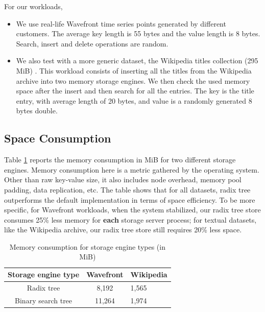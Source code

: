 \documentclass[sigplan,screen,nonacm]{acmart}
\begin{document}
For our workloads, 
\begin{itemize}
    \item We use real-life Wavefront time series points generated by different customers. The average key length is 55 bytes and the value length is 8 bytes. Search, insert and delete operations are random. 
    \item We also test with a more generic dataset, the Wikipedia titles collection (295 MiB) \cite{wikidatasets}. This workload consists of inserting all the titles from the Wikipedia archive into two memory storage engines. We then check the used memory space after the insert and then search for all the entries. The key is the title entry, with average length of 20 bytes, and value is a randomly generated 8 bytes double. 
\end{itemize}

\subsection{Space Consumption}
Table \ref{tab:memory-usage} reports the memory consumption in MiB for two different storage engines. Memory consumption here is a metric gathered by the operating system.  Other than raw key-value size, it also includes node overhead, memory pool padding, data replication, etc. The table shows that for all datasets, radix tree outperforms the default implementation in terms of space efficiency. To be more specific, for Wavefront workloads, when the system stabilized, our radix tree store consumes 25\% less memory for \textbf {each} storage server process; for textual datasets, like the Wikipedia archive, our radix tree store still requires 20\% less space. 
\begin{table}[h]
  \caption{Memory consumption for storage engine types (in MiB)}
  \begin{tabular}{ccl}
    \toprule
    Storage engine type&Wavefront&Wikipedia\\
    \midrule
    Radix tree & 8,192 & 1,565\\
    Binary search tree & 11,264 & 1,974\\
    \bottomrule
  \end{tabular}
  \label{tab:memory-usage}
\end{table}
\end{document}
